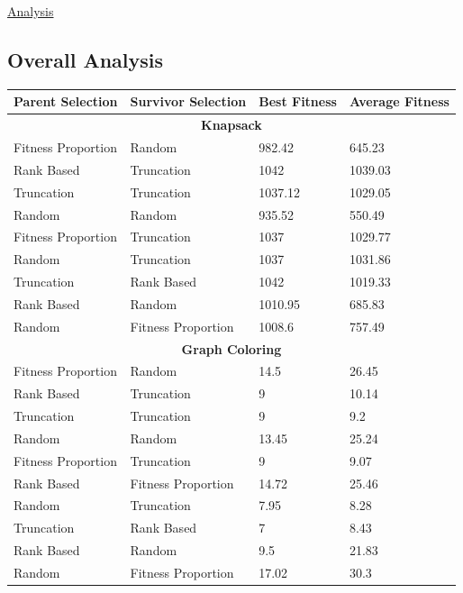 \documentclass[11pt, letterpaper]{article}
\begin{document}
\underline{Analysis}

\newpage

\subsection {Overall Analysis}
\begin{table}[ht]
    \centering
    \begin{tabular}{|l|l|l|l|}
    \hline
        \textbf{Parent Selection} & \textbf{Survivor Selection} & \textbf{Best Fitness} & \textbf{Average Fitness} \\ \hline
        \multicolumn{4}{|c|}{\textbf{Knapsack}} \\ \hline
        Fitness Proportion & Random & 982.42 & 645.23 \\ \hline
        Rank Based & Truncation & 1042 & 1039.03 \\ \hline
        Truncation & Truncation & 1037.12 & 1029.05 \\ \hline
        Random & Random & 935.52 & 550.49 \\ \hline
        Fitness Proportion & Truncation & 1037 & 1029.77 \\ \hline
        Random & Truncation & 1037 & 1031.86 \\ \hline
        Truncation & Rank Based & 1042 & 1019.33 \\ \hline
        Rank Based & Random & 1010.95 & 685.83 \\ \hline
        Random & Fitness Proportion & 1008.6 & 757.49 \\ \hline
        \multicolumn{4}{|c|}{\textbf{Graph Coloring}} \\ \hline
        Fitness Proportion & Random & 14.5 & 26.45 \\ \hline
        Rank Based & Truncation & 9 & 10.14 \\ \hline
        Truncation & Truncation & 9 & 9.2 \\ \hline
        Random & Random & 13.45 & 25.24 \\ \hline
        Fitness Proportion & Truncation & 9 & 9.07 \\ \hline
        Rank Based & Fitness Proportion & 14.72 & 25.46 \\ \hline
        Random & Truncation & 7.95 & 8.28 \\ \hline
        Truncation & Rank Based & 7 & 8.43 \\ \hline
        Rank Based & Random & 9.5 & 21.83 \\ \hline
        Random & Fitness Proportion & 17.02 & 30.3 \\ \hline

\end{tabular}
\end{table}
\end{document}
